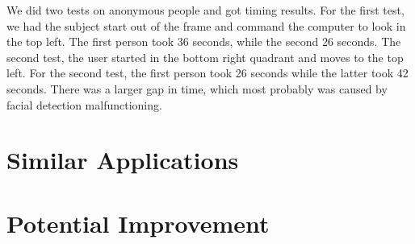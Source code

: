 \documentclass{article}
\begin{document}
We did two tests on anonymous people and got timing results.
For the first test, we had the subject start out of the frame and command the computer to look in the top left.
The first person took 36 seconds, while the second 26 seconds.
The second test, the user started in the bottom right quadrant and moves to the top left.
For the second test, the first person took 26 seconds while the latter took 42 seconds.
There was a larger gap in time, which most probably was caused by facial detection malfunctioning.

\section{Similar Applications}
\section{Potential Improvement}





\end{document}
